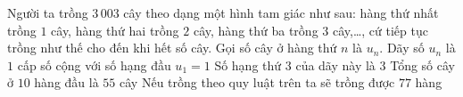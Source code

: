 \begin{ex}%
	Người ta trồng $3\,003$ cây theo dạng một hình tam giác như sau: hàng  thứ nhất trồng $1$ cây, hàng thứ hai trồng $2$ cây, hàng thứ ba trồng $3$ cây,\ldots, cứ tiếp tục trồng như thế cho đến khi hết số cây. Gọi số cây ở hàng thứ $n$ là $u_n$.
	\choiceTF 
		{\True Dãy số $u_n$ là $1$ cấp số cộng với số hạng đầu  $u_1=1$}
		{\True Số hạng thứ $3$ của  dãy này là $3$}
		{\True Tổng số  cây ở $10$ hàng đầu là $55$ cây}
		{Nếu  trồng theo quy luật trên ta sẽ trồng được $77$ hàng}
\end{ex}

